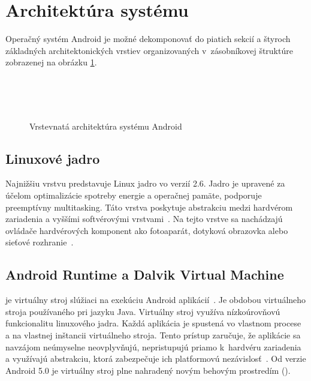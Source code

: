 \section{Architektúra systému}
Operačný systém Android je možné dekomponovať do piatich sekcií a štyroch základných architektonických vrstiev organizovaných v~zásobníkovej štruktúre~\cite{Gunasekera2012} zobrazenej na obrázku \ref{fig:struktura}.
\begin{figure} [htb]
 \centering
	\\
	\\
	\\
  \caption{Vrstevnatá architektúra systému Android}
  \label{fig:struktura}
\end{figure}
\subsection{Linuxové jadro}
Najnižšiu vrstvu predstavuje Linux jadro vo verzií 2.6. Jadro je upravené za účelom optimalizácie spotreby energie a operačnej pamäte, podporuje preemptívny multitasking. Táto vrstva poskytuje abstrakciu medzi hardvérom zariadenia a vyššími softvérovými vrstvami~\cite{Allen2010}. Na tejto vrstve sa nachádzajú ovládače hardvérových komponent ako fotoaparát, dotyková obrazovka alebo sieťové rozhranie~\cite{architecture}.
\subsection{Android Runtime a Dalvik Virtual Machine}
 je virtuálny stroj slúžiaci na exekúciu Android aplikácií~\cite{dalvik}. Je obdobou virtuálneho stroja  používaného pri jazyku Java. Virtuálny stroj  využíva nízkoúrovňovú funkcionalitu linuxového jadra. Každá aplikácia je spustená vo vlastnom procese a na vlastnej inštancii virtuálneho stroja. Tento prístup zaručuje, že aplikácie sa navzájom neúmyselne neovplyvňujú, nepristupujú priamo k~hardvéru zariadenia a využívajú abstrakciu, ktorá zabezpečuje ich platformovú nezávislosť~\cite{architecture}.  Od verzie Android 5.0 je virtuálny stroj  plne nahradený novým behovým prostredím  ().
